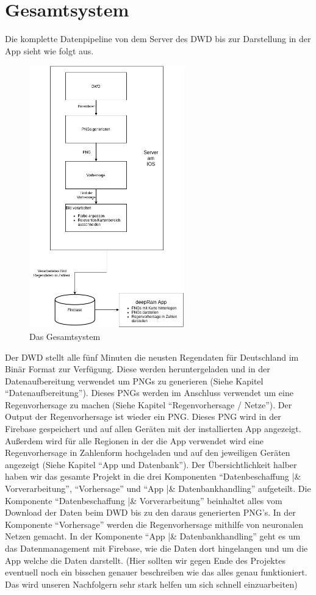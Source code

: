 \section{Gesamtsystem}\label{gesamtsystem}
Die komplette Datenpipeline von dem Server des DWD bis zur Darstellung in der App sieht wie folgt aus.  

\begin{figure}[htb]
 \centering
 \includegraphics[width=0.6\textwidth,angle=0]{abb/Gesamtsystem}
 \caption[Das Gesamtsystem]{Das Gesamtsystem}
\label{fig:Beschreibung}
\end{figure}

Der DWD stellt alle fünf Minuten die neusten Regendaten für Deutschland im Binär Format zur Verfügung. Diese werden heruntergeladen und in der Datenaufbereitung verwendet um PNGs zu generieren (Siehe Kapitel “Datenaufbereitung”). Dieses PNGs werden im Anschluss verwendet um eine Regenvorhersage zu machen (Siehe Kapitel “Regenvorhersage / Netze”). Der Output der Regenvorhersage ist wieder ein PNG. Dieses PNG wird in der Firebase gespeichert und auf allen Geräten mit der installierten App angezeigt. Außerdem wird für alle Regionen in der die App verwendet wird eine Regenvorhersage in Zahlenform hochgeladen und auf den jeweiligen Geräten angezeigt (Siehe Kapitel “App und Datenbank”). 
Der Übersichtlichkeit halber haben wir das gesamte Projekt in die drei Komponenten “Datenbeschaffung |\& Vorverarbeitung”, “Vorhersage” und “App |\& Datenbankhandling” aufgeteilt.  
Die Komponente “Datenbeschaffung |\& Vorverarbeitung” beinhaltet alles vom Download der Daten beim DWD bis zu den daraus generierten PNG’s. In der Komponente “Vorhersage” werden die Regenvorhersage mithilfe von neuronalen Netzen gemacht. In der Komponente “App |\& Datenbankhandling” geht es um das Datenmanagement mit Firebase, wie die Daten dort hingelangen und um die App welche die Daten darstellt.  
(Hier sollten wir gegen Ende des Projektes eventuell noch ein bisschen genauer beschreiben wie das alles genau funktioniert. Das wird unseren Nachfolgern sehr stark helfen um sich schnell einzuarbeiten)  